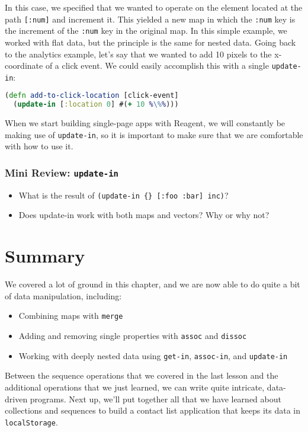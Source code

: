 \documentclass[10pt,twoside,openright]{memoir}
\begin{document}
In this case, we specified that we wanted to operate on the element
located at the path \texttt{{[}:num{]}} and increment it. This yielded a
new map in which the \texttt{:num} key is the increment of the
\texttt{:num} key in the original map. In this simple example, we worked
with flat data, but the principle is the same for nested data. Going
back to the analytics example, let's say that we wanted to add 10 pixels to
the x-coordinate of a click event. We could easily accomplish this with
a single \texttt{update-in}:

\begin{lstlisting}[language=Clojure]
(defn add-to-click-location [click-event]
  (update-in [:location 0] #(+ 10 %\%%)))
\end{lstlisting}

When we start building single-page apps with Reagent, we will constantly
be making use of \texttt{update-in}, so it is important to make sure
that we are comfortable with how to use it.


\subsubsection{Mini Review: \texttt{update-in}}

\begin{itemize}
\tightlist
\item
  What is the result of
  \texttt{(update-in\ \{\}\ {[}:foo\ :bar{]}\ inc)}?
\item
  Does update-in work with both maps and vectors? Why or why not?
\end{itemize}


\section{Summary}

We covered a lot of ground in this chapter, and we are now able to do
quite a bit of data manipulation, including:

\begin{itemize}
\tightlist
\item
  Combining maps with \texttt{merge}
\item
  Adding and removing single properties with \texttt{assoc} and
  \texttt{dissoc}
\item
  Working with deeply nested data using \texttt{get-in},
  \texttt{assoc-in}, and \texttt{update-in}
\end{itemize}

Between the sequence operations that we covered in the last lesson and
the additional operations that we just learned, we can write quite
intricate, data-driven programs. Next up, we'll put together all that we
have learned about collections and sequences to build a contact list
application that keeps its data in \texttt{localStorage}.
\end{document}
